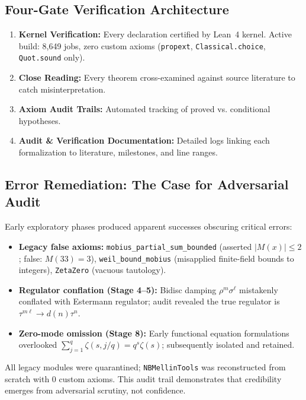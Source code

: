 \documentclass[11pt,a4paper]{article}
\theoremstyle{plain}
\theoremstyle{definition}
\theoremstyle{remark}
\begin{document}
\subsection{Four-Gate Verification Architecture}

\begin{enumerate}[leftmargin=2em]
  \item \textbf{Kernel Verification:} Every declaration certified by Lean~4 kernel. Active build: 8,649 jobs, zero custom axioms (\texttt{propext}, \texttt{Classical.choice}, \texttt{Quot.sound} only).
  \item \textbf{Close Reading:} Every theorem cross-examined against source literature to catch misinterpretation.
  \item \textbf{Axiom Audit Trails:} Automated tracking of proved vs. conditional hypotheses.
  \item \textbf{Audit \& Verification Documentation:} Detailed logs linking each formalization to literature, milestones, and line ranges.
\end{enumerate}

\subsection{Error Remediation: The Case for Adversarial Audit}

Early exploratory phases produced apparent successes obscuring critical errors:

\begin{itemize}[leftmargin=2em]
  \item \textbf{Legacy false axioms:} \texttt{mobius\_partial\_sum\_bounded} (asserted $|M(x)| \le 2$; false: $M(33)=3$), \texttt{weil\_bound\_mobius} (misapplied finite-field bounds to integers), \texttt{ZetaZero} (vacuous tautology).
  \item \textbf{Regulator conflation (Stage 4--5):} Bidisc damping $\rho^m \sigma^\ell$ mistakenly conflated with Estermann regulator; audit revealed the true regulator is $\tau^{m\ell} \to d(n)\tau^n$.
  \item \textbf{Zero-mode omission (Stage 8):} Early functional equation formulations overlooked $\sum_{j=1}^q \zeta(s, j/q) = q^s \zeta(s)$; subsequently isolated and retained.
\end{itemize}

All legacy modules were quarantined; \texttt{NBMellinTools} was reconstructed from scratch with 0 custom axioms. This audit trail demonstrates that credibility emerges from adversarial scrutiny, not confidence.
\end{document}
